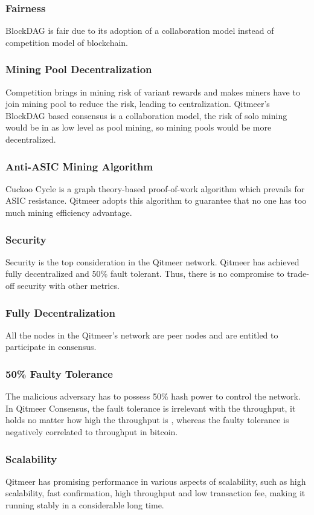 \documentclass[a4paper,11pt]{article}
\begin{document}
\subsubsection{Fairness}
BlockDAG is fair due to its adoption of a collaboration model instead of competition model of blockchain.
\subsubsection*{Mining Pool Decentralization}
Competition brings in mining risk of variant rewards and makes miners have to join mining pool to reduce the risk, leading to centralization. Qitmeer's BlockDAG based consensus is a collaboration model, the risk of solo mining would be in as low level as pool mining, so mining pools would be more decentralized.

\subsubsection*{Anti-ASIC Mining Algorithm}

Cuckoo Cycle is a graph theory-based proof-of-work algorithm which prevails for ASIC resistance. Qitmeer adopts this algorithm to guarantee that no one has too much mining efficiency advantage.
\subsubsection{Security}
Security is the top consideration in the Qitmeer network. Qitmeer has achieved fully decentralized and 50\% fault tolerant. Thus, there is no compromise to trade-off security with other metrics.
\subsubsection*{Fully Decentralization}
All the nodes in the Qitmeer’s network are peer nodes and are entitled to participate in consensus.
\subsubsection*{50\% Faulty Tolerance}
The malicious adversary has to possess 50\% hash power to control the network. In Qitmeer Consensus, the fault tolerance is irrelevant with the throughput, it holds no matter how high the throughput is , whereas the faulty tolerance is negatively correlated to throughput in bitcoin.

\subsubsection{Scalability}
Qitmeer has promising performance in various aspects of scalability, such as high scalability, fast confirmation, high throughput and low transaction fee, making it running stably in a considerable long time.
\end{document}
